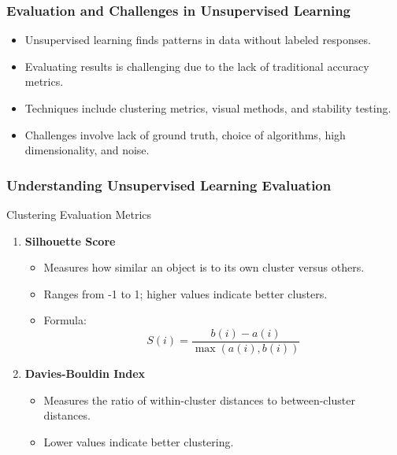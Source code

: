 \documentclass{beamer}
\begin{document}
\begin{frame}
    \frametitle{Evaluation and Challenges in Unsupervised Learning}
    \begin{itemize}
        \item Unsupervised learning finds patterns in data without labeled responses.
        \item Evaluating results is challenging due to the lack of traditional accuracy metrics.
        \item Techniques include clustering metrics, visual methods, and stability testing.
        \item Challenges involve lack of ground truth, choice of algorithms, high dimensionality, and noise.
    \end{itemize}
\end{frame}

\begin{frame}
    \frametitle{Understanding Unsupervised Learning Evaluation}
    \begin{block}{Clustering Evaluation Metrics}
        \begin{enumerate}
            \item \textbf{Silhouette Score}
            \begin{itemize}
                \item Measures how similar an object is to its own cluster versus others.
                \item Ranges from -1 to 1; higher values indicate better clusters.
                \item Formula:
                \begin{equation}
                S(i) = \frac{b(i) - a(i)}{\max(a(i), b(i))}
                \end{equation}
            \end{itemize}
            
            \item \textbf{Davies-Bouldin Index}
            \begin{itemize}
                \item Measures the ratio of within-cluster distances to between-cluster distances.
                \item Lower values indicate better clustering.
            \end{itemize}
        \end{enumerate}
    \end{block}
\end{frame}
\end{document}
